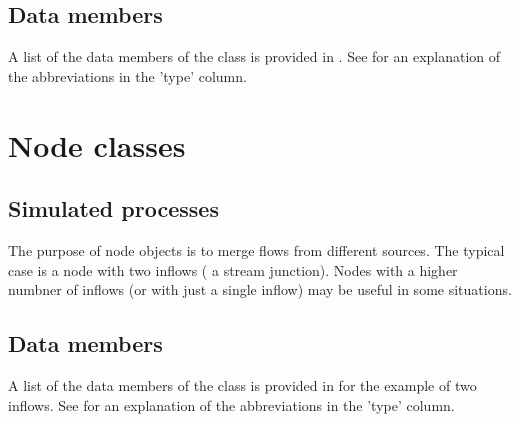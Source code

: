 \subsection{Data members} \label{sec:classes:catchmod:minireach:members}
A list of the data members of the class is provided in . See \citet{Echse-Main-Doc} for an explanation of the abbreviations in the 'type' column.



\section{Node classes} \label{sec:classes:catchmod:nodes}

\subsection{Simulated processes} \label{sec:classes:catchmod:nodes:processes}
The purpose of node objects is to merge flows from different sources. The typical case is a node with two inflows (\eg{} a stream junction). Nodes with a higher numbner of inflows (or with just a single inflow) may be useful in some situations.

\subsection{Data members} \label{sec:classes:catchmod:nodes:members}
A list of the data members of the class is provided in  for the example of two inflows. See \citet{Echse-Main-Doc} for an explanation of the abbreviations in the 'type' column.



